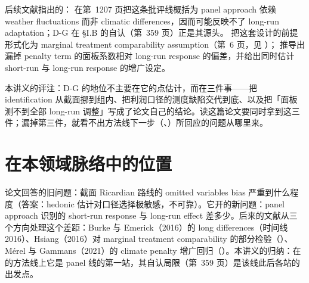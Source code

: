 后续文献指出的：\citet{merel2021climate} 在第~1207 页把这条批评线概括为 panel approach 依赖 weather fluctuations 而非 climatic differences，因而可能反映不了 long-run adaptation；D-G 在 \S I.B 的自认（第~359 页）正是其源头。\citet{hsiang2016climate} 把这套设计的前提形式化为 marginal treatment comparability assumption（第~6 页，见 ）； 推导出漏掉 penalty term 的面板系数相对 long-run response 的偏差，并给出同时估计 short-run 与 long-run response 的增广设定。

本讲义的评注：D-G 的地位不主要在它的点估计，而在三件事——把 identification 从截面挪到组内、把利润口径的测度缺陷交代到底、以及把「面板测不到全部 long-run 调整」写成了论文自己的结论。读这篇论文要同时拿到这三件；漏掉第三件，就看不出方法线下一步（、）所回应的问题从哪里来。

\section{在本领域脉络中的位置}

论文回答的旧问题：截面 Ricardian 路线的 omitted variables bias 严重到什么程度（答案：hedonic 估计对口径选择极敏感，不可靠）。它开的新问题：panel approach 识别的 short-run response 与 long-run effect 差多少。后来的文献从三个方向处理这个差距：Burke 与 Emerick（2016）的 long differences（时间线 2016）、Hsiang（2016）对 marginal treatment comparability 的部分检验（）、Mérel 与 Gammans（2021）的 climate penalty 增广回归（）。本讲义的归纳：在  的方法线上它是 panel 线的第一站，其自认局限（第~359 页）是该线此后各站的出发点。

\chapterrefs
